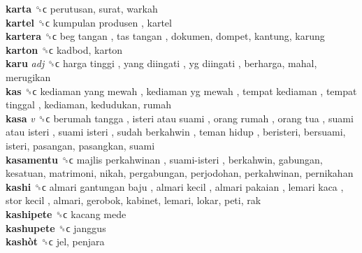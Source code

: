 \textbf{karta} ␝ϲ  perutusan, surat, warkah  \\
\textbf{kartel} ␝ϲ   kumpulan produsen , kartel  \\
\textbf{kartera} ␝ϲ   beg tangan ,  tas tangan , dokumen, dompet, kantung, karung  \\
\textbf{karton} ␝ϲ  kadbod, karton  \\
\textbf{karu} \emph{adj}  ␝ϲ   harga tinggi ,  yang diingati ,  yg diingati , berharga, mahal, merugikan  \\
\textbf{kas} ␝ϲ   kediaman yang mewah ,  kediaman yg mewah ,  tempat kediaman ,  tempat tinggal , kediaman, kedudukan, rumah  \\
\textbf{kasa} \emph{v}  ␝ϲ   berumah tangga ,  isteri atau suami ,  orang rumah ,  orang tua ,  suami atau isteri ,  suami isteri ,  sudah berkahwin ,  teman hidup , beristeri, bersuami, isteri, pasangan, pasangkan, suami  \\
\textbf{kasamentu} ␝ϲ   majlis perkahwinan ,  suami-isteri , berkahwin, gabungan, kesatuan, matrimoni, nikah, pergabungan, perjodohan, perkahwinan, pernikahan  \\
\textbf{kashi} ␝ϲ   almari gantungan baju ,  almari kecil ,  almari pakaian ,  lemari kaca ,  stor kecil , almari, gerobok, kabinet, lemari, lokar, peti, rak  \\
\textbf{kashipete} ␝ϲ   kacang mede   \\
\textbf{kashupete} ␝ϲ  janggus  \\
\textbf{kashòt} ␝ϲ  jel, penjara  \\
